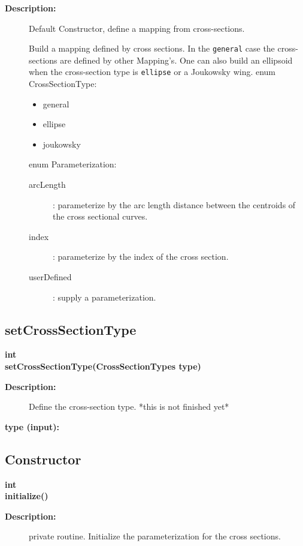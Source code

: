 \begin{description}
\item[{\bf Description:}]  Default Constructor, define a mapping from cross-sections.

 Build a mapping defined by cross sections. In the {\tt general} case the cross-sections
  are defined by other Mapping's. One can also build an ellipsoid when the cross-section
 type is {\tt ellipse} or a Joukowsky wing.
 enum CrossSectionType:
 \begin{itemize}
  \item general
  \item ellipse
  \item joukowsky
 \end{itemize}

  enum Parameterization:
 \begin{description}
  \item[arcLength] : parameterize by the arc length distance between the centroids of the cross sectional curves.
  \item[index] : parameterize by the index of the cross section.
  \item[userDefined] : supply a parameterization.
 \end{description}
\end{description}
\subsection{setCrossSectionType}
 
\begin{flushleft} \textbf{%
int  \\ 
\settowidth{\CrossSectionMappingIncludeArgIndent}{setCrossSectionType(}%
setCrossSectionType(CrossSectionTypes type)
}\end{flushleft}
\begin{description}
\item[{\bf Description:}] 
   Define the cross-section type.  *this is not finished yet*
\item[{\bf type (input):}] 

\end{description}
\subsection{Constructor}
 
\begin{flushleft} \textbf{%
int  \\ 
\settowidth{\CrossSectionMappingIncludeArgIndent}{initialize(}%
initialize()
}\end{flushleft}
\begin{description}
\item[{\bf Description:}]  private routine. Initialize the parameterization for the
  cross sections.

\end{description}
